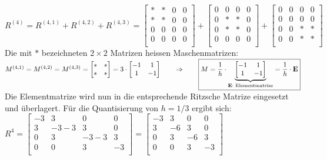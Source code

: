 \qquad $R^{(4)}=R^{(4,1)}+R^{(4,2)}+R^{(4,3)}=
\begin{bmatrix}
	* & * & 0 & 0\\
	* & * & 0 & 0\\
	0 & 0 & 0 & 0\\
	0 & 0 & 0 & 0\\
\end{bmatrix}+
\begin{bmatrix}
	0 & 0 & 0 & 0\\
	0 & * & * & 0\\
	0 & * & * & 0\\
	0 & 0 & 0 & 0\\
\end{bmatrix}+
\begin{bmatrix}
	0 & 0 & 0 & 0\\
	0 & 0 & 0 & 0\\
	0 & 0 & * & *\\
	0 & 0 & * & *\\
\end{bmatrix}
$\\

Die mit $*$ bezeichneten $2\times 2$ Matrizen heissen Maschenmatrizen:\\

$M^{(4,1)}=M^{(4,2)}=M^{(4,3)}=
\begin{bmatrix}
	* & *\\
	* & *\\
\end{bmatrix}=3\cdot\begin{bmatrix}
	-1 & 1\\
	1 & -1\\
\end{bmatrix}\qquad\Rightarrow\qquad\boxed{M=\frac 1h\cdot
\underset{\text{\textbf{E}: Elementmatrize}}{\underbrace{\begin{bmatrix}
	-1 & 1\\
	1 & -1\\
\end{bmatrix}}}=\frac 1h\cdot \mathbf{E}}$\\

Die Elementmatrize wird nun in die entsprechende Ritzsche Matrize eingesetzt und überlagert. Für die Quantisierung von $h=1/3$ ergibt sich:\\

$R^{4}=
\begin{bmatrix}
	-3 & 3 & 0 & 0 \\
	3 & -3-3 & 3 & 0 \\
	0 & 3 & -3-3 & 3 \\
	0 & 0 & 3 & -3 \\
\end{bmatrix}=
\begin{bmatrix}
	-3 & 3 & 0 & 0 \\
	3 & -6 & 3 & 0 \\
	0 & 3 & -6 & 3 \\
	0 & 0 & 3 & -3 \\
\end{bmatrix}$\\

